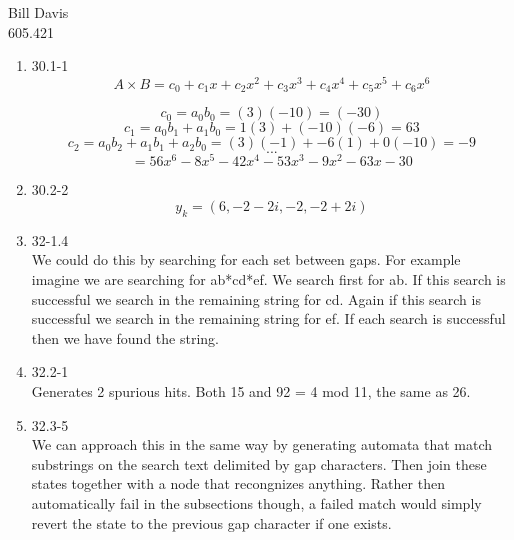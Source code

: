 \documentclass[11pt,fleqn]{article}
\begin{document}
\newcommand{\mbf}[1]{\mbox{{\bfseries #1}}}
\newcommand{\N}{\mbf{N}}
\renewcommand{\O}{\mbf{O}}

\noindent Bill Davis \\
605.421 

\begin{enumerate}
\item 30.1-1 \\
\[
A \times B = c_{0} + c_{1}x + c_{2}x^{2} + c_{3}x^{3} + c_{4}x^{4} + c_{5}x^{5} +c_{6}x^{6} 
\]

\[c_{0} = a_{0}b_{0} = (3)(-10) = (-30) \]
\[c_{1} = a_{0}b_{1}+a_{1}b_{0}=1(3)+(-10)(-6) = 63\]
\[c_{2} = a_{0}b_{2}+a_{1}b_{1}+a_{2}b_{0} = (3)(-1) + -6(1) + 0(-10) = -9\]
\[...\]
\[=56x^{6} -8x^{5} - 42x^{4} - 53x^{3} - 9x^{2} - 63x - 30\]


 

\item 30.2-2 \\
\[ y_{k} = (6, -2-2i, -2, -2+2i)\]

\item 32-1.4\\
We could do this by searching for each set between gaps. For example imagine we are searching for ab*cd*ef. We search first for ab. If this search is successful we search in the remaining string for cd. Again if this search is successful we search in the remaining string for ef. If each search is successful then we have found the string. 

\item  32.2-1 \\
Generates 2 spurious hits. Both 15 and 92 = 4 mod 11, the same as 26. 

\item 32.3-5 \\
We can approach this in the same way by generating automata that match substrings on the search text delimited by gap characters. Then join these states together with a node that recongnizes anything. Rather then automatically fail in the subsections though, a failed match would simply revert the state to the previous gap character if one exists. 

\end{enumerate}
\end{document}
